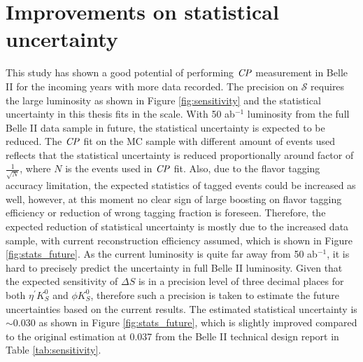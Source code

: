 
\section{Improvements on statistical uncertainty}
This study has shown a good potential of performing $\it{CP}$ measurement in Belle II for the incoming years with more data recorded. The precision on $\mathcal{S}$ requires the large luminosity as shown in Figure \ref{fig:sensitivity} and the statistical uncertainty in this thesis fits in the scale. With 50 ab$^{-1}$ luminosity from the full Belle II data sample in future, the statistical uncertainty is expected to be reduced. The $\it{CP}$ fit on the MC sample with different amount of events used reflects that the statistical uncertainty is reduced proportionally around factor of $\frac{1}{\sqrt{N}}$, where $N$ is the events used in $\it{CP}$ fit. Also, due to the flavor tagging accuracy limitation, the expected statistics of tagged events could be increased as well, however, at this moment no clear sign of large boosting on flavor tagging efficiency or reduction of wrong tagging fraction is foreseen. Therefore, the expected reduction of statistical uncertainty is mostly due to the increased data sample, with current reconstruction efficiency assumed, which is shown in Figure \ref{fig:stats_future}.  As the current luminosity is quite far away from 50 ab$^{-1}$, it is hard to precisely predict the uncertainty in full Belle II luminosity. Given that the expected sensitivity of $\Delta S$ is in a precision level of three decimal places for both $\eta^{'} K_S^0$ and $\phi K_S^0$\cite{b2book}, therefore such a precision is taken to estimate the future uncertainties based on the current results. The estimated statistical uncertainty is  $\sim 0.030$ as shown in Figure \ref{fig:stats_future}, which is slightly improved compared to the original estimation at 0.037 from the Belle II technical design report in Table \ref{tab:sensitivity}. 

